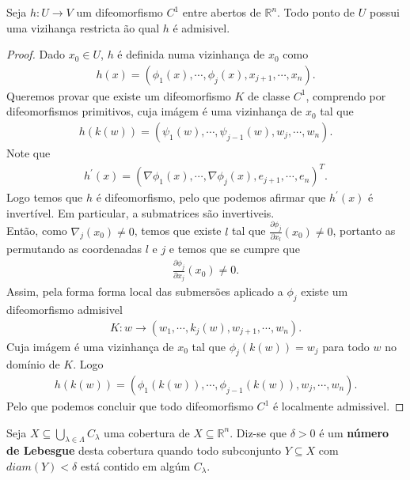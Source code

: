 \begin{theorem}\label{th:localmente-admissivel}
  Seja $h:U\to V$ um difeomorfismo $C^1$ entre abertos de $\mathbb{R}^{n}$. Todo ponto de $U$ possui uma vizihança restricta ão qual $h$ é admisivel. 
\end{theorem}
\begin{proof} 
  Dado $x_0\in U$, $h$ é definida numa vizinhança de $x_0$ como
  \begin{align*}
    h(x)=\left( \phi_1(x),\cdots,\phi_j(x),x_{j+1},\cdots,x_n \right).
  \end{align*}
  Queremos provar que existe um difeomorfismo $K$ de classe $C^{1}$, comprendo por difeomorfismos primitivos, cuja imágem é uma vizinhança de $x_0$ tal que
  \begin{align*}
    h(k(w))=\left( \psi_1(w),\cdots,\psi_{j-1}(w),w_j,\cdots,w_n \right).
  \end{align*}
  Note que
  \begin{align*}
    h^{\prime}(x)=\left( \nabla\phi_1(x),\cdots,\nabla\phi_{j}(x),e_{j+1},\cdots,e_{n} \right)^{T}.
  \end{align*}
  Logo temos que $h$ é difeomorfismo, pelo que podemos afirmar que $h^{\prime}(x)$ é invertível. Em particular, a submatrices são invertiveis.\\
  Então, como $\nabla_{j}(x_0)\neq 0$, temos que existe $l$ tal que $\frac{\partial \phi_j}{\partial x_l}(x_0)\neq 0$, portanto as permutando as coordenadas $l$ e $j$ e temos que se cumpre que
  \begin{align*}
    \frac{\partial \phi_j}{\partial x_j}(x_0)\neq 0.
  \end{align*}
  Assim, pela forma forma local das submersões aplicado a $\phi_j$ existe um difeomorfismo admisivel
  \begin{align*}
    K:w\to\left( w_1,\cdots,k_j(w),w_{j+1},\cdots,w_n \right).
  \end{align*}
  Cuja imágem é uma vizinhança de $x_0$ tal que $\phi_j(k(w))=w_j$ para todo $w$ no domínio de $K$. Logo
  \begin{align*}
    h(k(w))=\left( \phi_1(k(w)),\cdots,\phi_{j-1}(k(w)),w_j,\cdots,w_n \right).
  \end{align*}
  Pelo que podemos concluir que todo difeomorfismo $C^{1}$ é localmente admissivel. 
\end{proof}
\begin{definition}
  Seja $X\subseteq \bigcup_{\lambda\in \Lambda}C_{\lambda}$ uma cobertura de $X\subseteq\mathbb{R}^{n}$. Diz-se que $\delta>0$ é um \textbf{número de Lebesgue} desta cobertura quando todo subconjunto $Y\subseteq X$ com $diam(Y)<\delta$ está contido em algúm $C_{\lambda}$. 
\end{definition}
